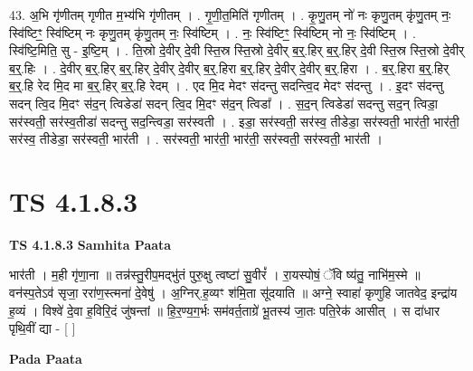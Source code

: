 \documentclass[17pt]{extarticle}
\begin{document}
43. अ॒भि गृ॑णीतम् गृणीत म॒भ्य॑भि गृ॑णीतम् । . गृ॒णी॒त॒मिति॑ गृणीतम् । . कृ॒णु॒तम् नो॑ नः कृणु॒तम् कृ॑णु॒तम् नः॒ स्वि॑ष्टिꣳ॒॒ स्वि॑ष्टिम् नः कृणु॒तम् कृ॑णु॒तम् नः॒ स्वि॑ष्टिम् । . नः॒ स्वि॑ष्टिꣳ॒॒ स्वि॑ष्टिम् नो नः॒ स्वि॑ष्टिम् । . स्वि॑ष्टि॒मिति॒ सु - इ॒ष्टि॒म् । . ति॒स्रो दे॒वीर् दे॒वी स्ति॒स्र स्ति॒स्रो दे॒वीर् ब॒र्॒.हिर् ब॒र्॒.हिर् दे॒वी स्ति॒स्र स्ति॒स्रो दे॒वीर् ब॒र्॒.हिः । . दे॒वीर् ब॒र्॒.हिर् ब॒र्॒.हिर् दे॒वीर् दे॒वीर् ब॒र्॒.हिरा ब॒र्॒.हिर् दे॒वीर् दे॒वीर् ब॒र्॒.हिरा । . ब॒र्॒.हिरा ब॒र्॒.हिर् ब॒र्॒.हि रेद मि॒द मा ब॒र्॒.हिर् ब॒र्॒.हि रेदम् । . एद मि॒द मेदꣳ स॑दन्तु सदन्त्वि॒द मेदꣳ स॑दन्तु । . इ॒दꣳ स॑दन्तु सदन् त्वि॒द मि॒दꣳ स॑द॒न् त्विडेडा॑ सदन् त्वि॒द मि॒दꣳ स॑द॒न् त्विडा᳚ । . स॒द॒न् त्विडेडा॑ सदन्तु सद॒न् त्विडा॒ सर॑स्वती॒ सर॑स्व॒तीडा॑ सदन्तु सद॒न्त्विडा॒ सर॑स्वती । . इडा॒ सर॑स्वती॒ सर॑स्व॒ तीडेडा॒ सर॑स्वती॒ भार॑ती॒ भार॑ती॒ सर॑स्व॒ तीडेडा॒ सर॑स्वती॒ भार॑ती । . सर॑स्वती॒ भार॑ती॒ भार॑ती॒ सर॑स्वती॒ सर॑स्वती॒ भार॑ती । \newline
\pagebreak
{}

\section{ TS 4.1.8.3 }

\textbf{TS 4.1.8.3 } \newline
\textbf{Samhita Paata} \newline

भार॑ती । म॒ही गृ॑णा॒ना ॥ तन्न॑स्तु॒रीप॒मद्भु॑तं पुरु॒क्षु त्वष्टा॑ सु॒वीरं᳚ । रा॒यस्पोषं॒ ॅवि ष्य॑तु॒ नाभि॑म॒स्मे ॥ वन॑स्प॒तेऽव॑ सृजा॒ ररा॑ण॒स्त्मना॑ दे॒वेषु॑ । अ॒ग्निर्.ह॒व्यꣳ श॑मि॒ता सू॑दयाति ॥ अग्ने॒ स्वाहा॑ कृणुहि जातवेद॒ इन्द्रा॑य ह॒व्यं । विश्वे॑ दे॒वा ह॒विरि॒दं जु॑षन्तां ॥ हि॒र॒ण्य॒ग॒र्भः सम॑वर्त॒ताग्रे॑ भू॒तस्य॑ जा॒तः पति॒रेक॑ आसीत् । स दा॑धार पृथि॒वीं द्या - [  ] \newline

\textbf{Pada Paata} \newline
\end{document}
